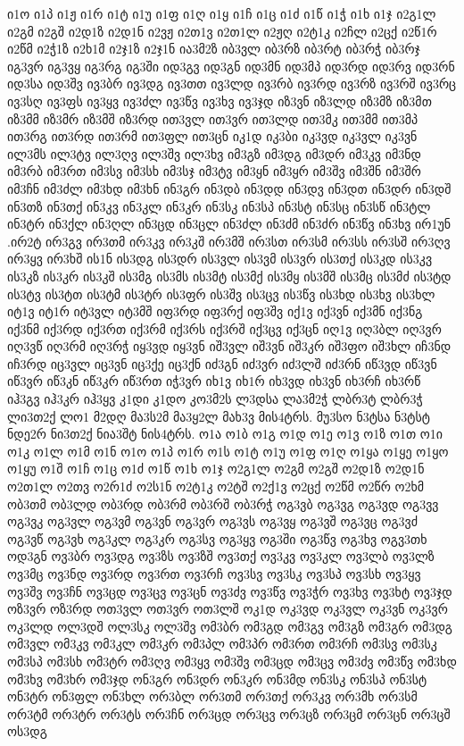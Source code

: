 {{ი1ო
ი1პ
ი1ჟ
ი1რ
ი1ტ
ი1უ
ი1ფ
ი1ღ
ი1ყ
ი1ჩ
ი1ც
ი1ძ
ი1წ
ი1ჭ
ი1ხ
ი1ჯ
ი2გ1ლ
ი2გმ
ი2გშ
ი2დ1ზ
ი2დ1ნ
ი2ვჟ
ი2თ1ვ
ი2თ1ლ
ი2ჟღ
ი2ტ1კ
ი2ჩლ
ი2ცქ
ი2წ1რ
ი2წმ
ი2ჭ1ზ
ი2ხ1მ
ი2ჯ1ზ
ი2ჯ1ნ
ია3მ2ზ
იბ3ვლ
იბ3რზ
იბ3რტ
იბ3რჭ
იბ3რჯ
იგ3ვრ
იგ3ვყ
იგ3რგ
იგ3ში
იდ3გვ
იდ3გნ
იდ3მნ
იდ3მპ
იდ3რდ
იდ3რვ
იდ3რნ
იდ3სა
იდ3შვ
ივ3ბრ
ივ3დგ
ივ3თთ
ივ3ლდ
ივ3რბ
ივ3რდ
ივ3რზ
ივ3რშ
ივ3რც
ივ3სღ
ივ3ფს
ივ3ყვ
ივ3ძლ
ივ3წვ
ივ3ხვ
ივ3ჯდ
იზ3ვნ
იზ3ლდ
იზ3მზ
იზ3მთ
იზ3მმ
იზ3მრ
იზ3მშ
იზ3რდ
ით3ვლ
ით3ვრ
ით3ლდ
ით3მკ
ით3მმ
ით3მპ
ით3რგ
ით3რდ
ით3რმ
ით3ფლ
ით3ცნ
იკ1დ
იკ3ბი
იკ3ვდ
იკ3ვლ
იკ3ვნ
ილ3მს
ილ3ტვ
ილ3ღვ
ილ3შვ
ილ3ხვ
იმ3გზ
იმ3დგ
იმ3დრ
იმ3კვ
იმ3ნდ
იმ3რბ
იმ3რთ
იმ3სვ
იმ3სხ
იმ3სჯ
იმ3ტვ
იმ3ყნ
იმ3ყრ
იმ3შვ
იმ3შნ
იმ3შრ
იმ3ჩნ
იმ3ძლ
იმ3ხდ
იმ3ხნ
ინ3გრ
ინ3დბ
ინ3დდ
ინ3დვ
ინ3დთ
ინ3დრ
ინ3დშ
ინ3თზ
ინ3თქ
ინ3კვ
ინ3კლ
ინ3კრ
ინ3სკ
ინ3სპ
ინ3სტ
ინ3სც
ინ3სწ
ინ3ტლ
ინ3ტრ
ინ3ქლ
ინ3ღლ
ინ3ცდ
ინ3ცლ
ინ3ძლ
ინ3ძმ
ინ3ძრ
ინ3წვ
ინ3ხვ
ირ1უნ
.ირ2ტ
ირ3გვ
ირ3თმ
ირ3კვ
ირ3კშ
ირ3მშ
ირ3სთ
ირ3სმ
ირ3სს
ირ3სშ
ირ3ღვ
ირ3ყვ
ირ3ხშ
ის1ნ
ის3დგ
ის3დრ
ის3ვლ
ის3ვმ
ის3ვრ
ის3თქ
ის3კდ
ის3კვ
ის3კზ
ის3კრ
ის3კშ
ის3მგ
ის3მს
ის3მტ
ის3მქ
ის3მყ
ის3მშ
ის3მც
ის3მძ
ის3ტდ
ის3ტვ
ის3ტთ
ის3ტმ
ის3ტრ
ის3ფრ
ის3შვ
ის3ცვ
ის3წვ
ის3ხდ
ის3ხვ
ის3ხლ
იტ1ვ
იტ1რ
იტ3ვლ
იტ3მშ
იფ3რდ
იფ3რქ
იფ3შვ
იქ1ვ
იქ3ვნ
იქ3მნ
იქ3ნგ
იქ3ნმ
იქ3რდ
იქ3რთ
იქ3რმ
იქ3რს
იქ3რშ
იქ3ცვ
იქ3ცნ
იღ1ვ
იღ3ბლ
იღ3ვრ
იღ3ვწ
იღ3რმ
იღ3რჭ
იყ3ვდ
იყ3ვნ
იშ3ვლ
იშ3ვნ
იშ3კრ
იშ3ფო
იშ3ხლ
იჩ3ნდ
იჩ3რდ
იც3ვლ
იც3ვნ
იც3ქე
იც3ქნ
იძ3გნ
იძ3ვრ
იძ3ლშ
იძ3რნ
იწ3ვდ
იწ3ვნ
იწ3ვრ
იწ3კნ
იწ3კრ
იწ3რთ
იჭ3ვრ
იხ1ვ
იხ1რ
იხ3ვდ
იხ3ვნ
იხ3რჩ
იხ3რწ
იჰ3გვ
იჰ3კრ
იჰ3ყვ
კ1დი
კ1დო
კო3მ2ს
ლ3დსა
ლა3მ2ჭ
ლბრ3ტ
ლბრ3ჭ
ლი3თ2ქ
ლო1
მ2დღ
მა3ს2მ
მა3ყ2ლ
მახ3ვ
მის4ტრს.
მუ3სო
ნ3ტსა
ნ3ტსტ
ნდე2რ
ნი3თ2ქ
ნია3შტ
ნის4ტრს.
ო1ა
ო1ბ
ო1გ
ო1დ
ო1ე
ო1ვ
ო1ზ
ო1თ
ო1ი
ო1კ
ო1ლ
ო1მ
ო1ნ
ო1ო
ო1პ
ო1რ
ო1ს
ო1ტ
ო1უ
ო1ფ
ო1ღ
ო1ყა
ო1ყე
ო1ყო
ო1ყუ
ო1შ
ო1ჩ
ო1ც
ო1ძ
ო1წ
ო1ხ
ო1ჯ
ო2გ1ლ
ო2გმ
ო2გშ
ო2დ1ზ
ო2დ1ნ
ო2თ1ლ
ო2თვ
ო2რ1ძ
ო2ს1ნ
ო2ტ1კ
ო2ტშ
ო2ქ1ვ
ო2ცქ
ო2წმ
ო2წრ
ო2ხმ
ობ3თმ
ობ3ლდ
ობ3რდ
ობ3რმ
ობ3რშ
ობ3რჭ
ოგ3ვბ
ოგ3ვგ
ოგ3ვდ
ოგ3ვვ
ოგ3ვკ
ოგ3ვლ
ოგ3ვმ
ოგ3ვნ
ოგ3ვრ
ოგ3ვს
ოგ3ვყ
ოგ3ვშ
ოგ3ვც
ოგ3ვძ
ოგ3ვწ
ოგ3ვხ
ოგ3კლ
ოგ3კრ
ოგ3სვ
ოგ3ყვ
ოგ3ში
ოგ3წვ
ოგ3ხვ
ოგვ3თხ
ოდ3გნ
ოვ3ბრ
ოვ3დგ
ოვ3ზს
ოვ3ზშ
ოვ3თქ
ოვ3კვ
ოვ3კლ
ოვ3ლბ
ოვ3ლზ
ოვ3მც
ოვ3ნდ
ოვ3რდ
ოვ3რთ
ოვ3რჩ
ოვ3სვ
ოვ3სკ
ოვ3სპ
ოვ3სხ
ოვ3ყვ
ოვ3შვ
ოვ3ჩნ
ოვ3ცდ
ოვ3ცვ
ოვ3ცნ
ოვ3ძვ
ოვ3წვ
ოვ3ჭრ
ოვ3ხვ
ოვ3ხტ
ოვ3ჯდ
ოზ3ვრ
ოზ3რდ
ოთ3ვლ
ოთ3ვრ
ოთ3ლშ
ოკ1დ
ოკ3ვდ
ოკ3ვლ
ოკ3ვნ
ოკ3ვრ
ოკ3ლდ
ოლ3დშ
ოლ3სკ
ოლ3შვ
ომ3ბრ
ომ3გდ
ომ3გვ
ომ3გზ
ომ3გრ
ომ3დგ
ომ3ვლ
ომ3კვ
ომ3კლ
ომ3კრ
ომ3პლ
ომ3პრ
ომ3რთ
ომ3რჩ
ომ3სვ
ომ3სკ
ომ3სპ
ომ3სხ
ომ3ტრ
ომ3ღვ
ომ3ყვ
ომ3შვ
ომ3ცდ
ომ3ცვ
ომ3ძვ
ომ3წვ
ომ3ხდ
ომ3ხვ
ომ3ხრ
ომ3ჯდ
ონ3გრ
ონ3დრ
ონ3კრ
ონ3მდ
ონ3სკ
ონ3სპ
ონ3სტ
ონ3ტრ
ონ3ფლ
ონ3ხლ
ორ3ბლ
ორ3თმ
ორ3თქ
ორ3კვ
ორ3მხ
ორ3სმ
ორ3ტმ
ორ3ტრ
ორ3ტს
ორ3ჩნ
ორ3ცდ
ორ3ცვ
ორ3ცზ
ორ3ცმ
ორ3ცნ
ორ3ცშ
ოს3დგ
}}
